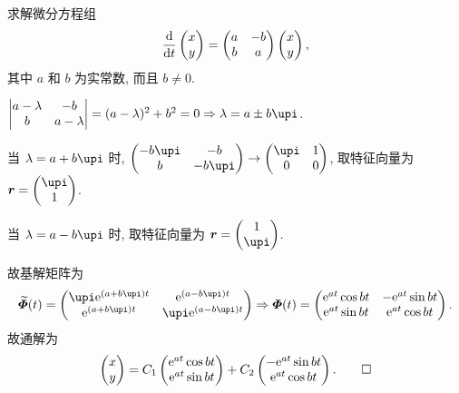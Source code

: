 \begin{exercise}
  求解微分方程组
  \[\frac{\mathop{}\!\mathrm{d}}{\mathop{}\!\mathrm{d} t}\begin{pmatrix}x\\y\end{pmatrix}
    = \begin{pmatrix}a&-b\\b&a\end{pmatrix}\begin{pmatrix}x\\y\end{pmatrix},\]
  其中 $a$ 和 $b$ 为实常数, 而且 $b\neq 0$.
\end{exercise}

\begin{solution}
  $\begin{vmatrix}a-\lambda&-b\\b&a-\lambda\end{vmatrix}=(a-\lambda)^2+b^2=0\Rightarrow\lambda=a\pm b\upi$.

  当 $\lambda=a+b\upi$ 时, 
  $\begin{pmatrix}-b\upi&-b\\b&-b\upi\end{pmatrix}\to\begin{pmatrix}\upi&1\\0&0\end{pmatrix}$, 
  取特征向量为 $\bm{r}=\begin{pmatrix}\upi\\1\end{pmatrix}$.

  当 $\lambda=a-b\upi$ 时, 取特征向量为 $\bm{r}=\begin{pmatrix}1\\\upi\end{pmatrix}$.

  故基解矩阵为
  \[\widetilde{\bmitPhi}(t) = 
    \begin{pmatrix}\upi\e^{(a+b\upi)t}&\e^{(a-b\upi)t}\\\e^{(a+b\upi)t}&\upi\e^{(a-b\upi)t}\end{pmatrix}
    \Rightarrow\bmitPhi(t) =
    \begin{pmatrix}\e^{at}\cos bt&-\e^{at}\sin bt\\ \e^{at}\sin bt&\e^{at}\cos bt\end{pmatrix}.\]
  故通解为
  \[\begin{pmatrix}x\\y\end{pmatrix} =
    C_1\begin{pmatrix}\mathrm{e}^{at}\cos bt\\\mathrm{e}^{at}\sin bt\end{pmatrix}
    + C_2\begin{pmatrix}-\mathrm{e}^{at}\sin bt\\\mathrm{e}^{at}\cos bt\end{pmatrix}.\qedhere\]
\end{solution}



